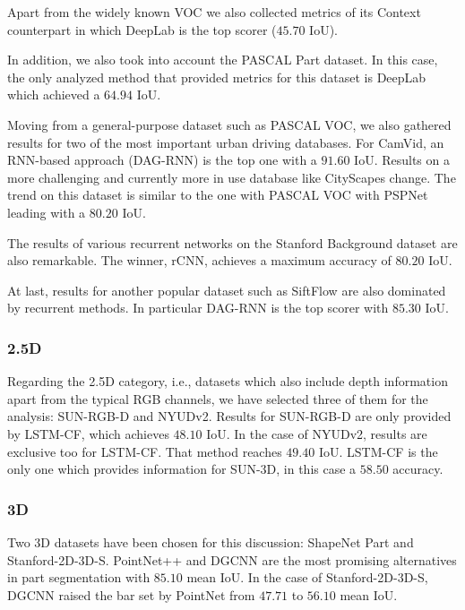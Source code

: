 Apart from the widely known \acs{VOC} we also collected metrics of its Context counterpart in which DeepLab is the top scorer ($45.70$ \acs{IoU}).

In addition, we also took into account the PASCAL Part dataset. In this case, the only analyzed method that provided metrics for this dataset is DeepLab which achieved a $64.94$ \acs{IoU}.

Moving from a general-purpose dataset such as PASCAL \acs{VOC}, we also gathered results for two of the most important urban driving databases. For CamVid, an \acs{RNN}-based approach (DAG-\acs{RNN}) is the top one with a $91.60$ \acs{IoU}. Results on a more challenging and currently more in use database like CityScapes change. The trend on this dataset is similar to the one with PASCAL \acs{VOC} with \acs{PSPNet} leading with a $80.20$ \acs{IoU}.

The results of various recurrent networks on the Stanford Background dataset are also remarkable. The winner, r\acs{CNN}, achieves a maximum accuracy of $80.20$ \acs{IoU}.

At last, results for another popular dataset such as SiftFlow are also dominated by recurrent methods. In particular DAG-\acs{RNN} is the top scorer with $85.30$ \acs{IoU}.

\subsubsection{\acs{2.5D}}

Regarding the \acs{2.5D} category, i.e., datasets which also include depth information apart from the typical \acs{RGB} channels, we have selected three of them for the analysis: SUN-\acs{RGB-D} and NYUDv2. Results for SUN-\acs{RGB-D} are only provided by \acs{LSTM-CF}, which achieves $48.10$ \acs{IoU}. In the case of NYUDv2, results are exclusive too for \acs{LSTM-CF}. That method reaches $49.40$ \acs{IoU}. \acs{LSTM-CF} is the only one which provides information for SUN-3D, in this case a $58.50$ accuracy.

\subsubsection{\acs{3D}}

Two \acs{3D} datasets have been chosen for this discussion: ShapeNet Part and Stanford-\acs{2D}-\acs{3D}-S. PointNet++ and \ac{DGCNN} are the most promising alternatives in part segmentation with $85.10$ mean \ac{IoU}. In the case of Stanford-\acs{2D}-\acs{3D}-S, \ac{DGCNN} raised the bar set by PointNet from $47.71$ to $56.10$ mean \ac{IoU}.

